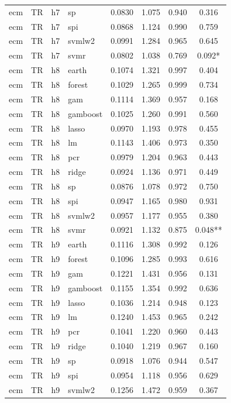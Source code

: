 \begin{ThreePartTable}
\begin{longtable}[t]{llclcccc}
ecm & TR & h7 & sp & 0.0830 & 1.075 & 0.940 & 0.316\\
ecm & TR & h7 & spi & 0.0868 & 1.124 & 0.990 & 0.759\\
ecm & TR & h7 & svmlw2 & 0.0991 & 1.284 & 0.965 & 0.645\\
ecm & TR & h7 & svmr & 0.0802 & 1.038 & 0.769 & 0.092*\\
\addlinespace
ecm & TR & h8 & earth & 0.1074 & 1.321 & 0.997 & 0.404\\
ecm & TR & h8 & forest & 0.1029 & 1.265 & 0.999 & 0.734\\
ecm & TR & h8 & gam & 0.1114 & 1.369 & 0.957 & 0.168\\
ecm & TR & h8 & gamboost & 0.1025 & 1.260 & 0.991 & 0.560\\
ecm & TR & h8 & lasso & 0.0970 & 1.193 & 0.978 & 0.455\\
ecm & TR & h8 & lm & 0.1143 & 1.406 & 0.973 & 0.350\\
ecm & TR & h8 & pcr & 0.0979 & 1.204 & 0.963 & 0.443\\
ecm & TR & h8 & ridge & 0.0924 & 1.136 & 0.971 & 0.449\\
ecm & TR & h8 & sp & 0.0876 & 1.078 & 0.972 & 0.750\\
ecm & TR & h8 & spi & 0.0947 & 1.165 & 0.980 & 0.931\\
ecm & TR & h8 & svmlw2 & 0.0957 & 1.177 & 0.955 & 0.380\\
ecm & TR & h8 & svmr & 0.0921 & 1.132 & 0.875 & 0.048**\\
\addlinespace
ecm & TR & h9 & earth & 0.1116 & 1.308 & 0.992 & 0.126\\
ecm & TR & h9 & forest & 0.1096 & 1.285 & 0.993 & 0.616\\
ecm & TR & h9 & gam & 0.1221 & 1.431 & 0.956 & 0.131\\
ecm & TR & h9 & gamboost & 0.1155 & 1.354 & 0.992 & 0.636\\
ecm & TR & h9 & lasso & 0.1036 & 1.214 & 0.948 & 0.123\\
ecm & TR & h9 & lm & 0.1240 & 1.453 & 0.965 & 0.242\\
ecm & TR & h9 & pcr & 0.1041 & 1.220 & 0.960 & 0.443\\
ecm & TR & h9 & ridge & 0.1040 & 1.219 & 0.967 & 0.160\\
ecm & TR & h9 & sp & 0.0918 & 1.076 & 0.944 & 0.547\\
ecm & TR & h9 & spi & 0.0954 & 1.118 & 0.956 & 0.629\\
ecm & TR & h9 & svmlw2 & 0.1256 & 1.472 & 0.959 & 0.367\\

\end{longtable}
\end{ThreePartTable}
